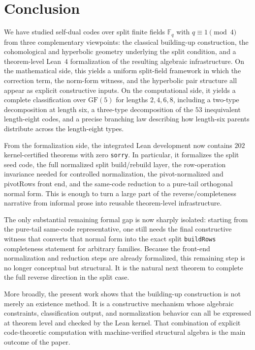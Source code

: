 \documentclass[12pt]{article}
\newcommand{\F}{\mathbb{F}}
\newcommand{\GF}[1]{\ensuremath{\mathrm{GF}(#1)}}
\begin{document}
\section{Conclusion}
\label{sec:conclusion}

We have studied self-dual codes over split finite fields $\F_q$ with $q\equiv 1 \pmod 4$ from three complementary viewpoints: the classical building-up construction, the cohomological and hyperbolic geometry underlying the split condition, and a theorem-level Lean~4 formalization of the resulting algebraic infrastructure. On the mathematical side, this yields a uniform split-field framework in which the correction term, the norm-form witness, and the hyperbolic pair structure all appear as explicit constructive inputs. On the computational side, it yields a complete classification over $\GF{5}$ for lengths $2,4,6,8$, including a two-type decomposition at length six, a three-type decomposition of the $53$ inequivalent length-eight codes, and a precise branching law describing how length-six parents distribute across the length-eight types.

From the formalization side, the integrated Lean development now contains $202$ kernel-certified theorems with zero \texttt{sorry}. In particular, it formalizes the split seed code, the full normalized split build/rebuild layer, the row-operation invariance needed for controlled normalization, the pivot-normalized and pivotRows front end, and the same-code reduction to a pure-tail orthogonal normal form. This is enough to turn a large part of the reverse/completeness narrative from informal prose into reusable theorem-level infrastructure.

The only substantial remaining formal gap is now sharply isolated: starting from the pure-tail same-code representative, one still needs the final constructive witness that converts that normal form into the exact split \texttt{buildRows} completeness statement for arbitrary families. Because the front-end normalization and reduction steps are already formalized, this remaining step is no longer conceptual but structural. It is the natural next theorem to complete the full reverse direction in the split case.

More broadly, the present work shows that the building-up construction is not merely an existence method. It is a constructive mechanism whose algebraic constraints, classification output, and normalization behavior can all be expressed at theorem level and checked by the Lean kernel. That combination of explicit code-theoretic computation with machine-verified structural algebra is the main outcome of the paper.
\end{document}
